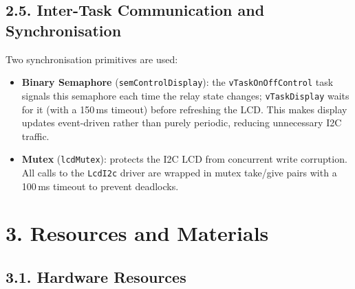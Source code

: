 \documentclass[12pt]{article}
\begin{document}
\subsection*{2.5. Inter-Task Communication and Synchronisation}

Two synchronisation primitives are used:
\begin{itemize}
    \item \textbf{Binary Semaphore} (\texttt{semControlDisplay}): the
          \texttt{vTaskOnOffControl} task signals this semaphore each time the relay
          state changes; \texttt{vTaskDisplay} waits for it (with a 150\,ms timeout)
          before refreshing the LCD.  This makes display updates event-driven rather
          than purely periodic, reducing unnecessary I2C traffic.
    \item \textbf{Mutex} (\texttt{lcdMutex}): protects the I2C LCD from concurrent
          write corruption.  All calls to the \texttt{LcdI2c} driver are wrapped in
          mutex take/give pairs with a 100\,ms timeout to prevent deadlocks.
\end{itemize}

\section*{3. Resources and Materials}

\subsection*{3.1. Hardware Resources}
\end{document}
